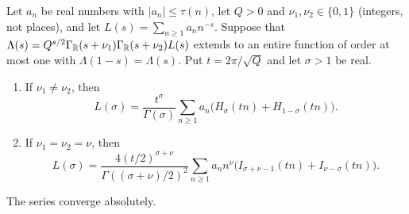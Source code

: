 \begin{lemma}\label{an:balanced-afe}
Let $a_n$ be real numbers with $|a_n|\le\tau(n)$, let $Q>0$ and
$\nu_1,\nu_2\in\{0,1\}$ (integers, not places), and let
$L(s)=\sum_{n\ge1}a_nn^{-s}$. Suppose that
$\Lambda(s)=Q^{s/2}\Gamma_\mathbb R(s+\nu_1)\Gamma_\mathbb R(s+\nu_2)L(s)$ extends to an
entire function of order at most one with $\Lambda(1-s)=\Lambda(s)$. Put
$t=2\pi/\sqrt Q$ and let $\sigma>1$ be real.
\begin{enumerate}
\item If $\nu_1\ne\nu_2$, then
\[
 L(\sigma)=\frac{t^\sigma}{\Gamma(\sigma)}\sum_{n\ge1}a_n
 \bigl(H_\sigma(tn)+H_{1-\sigma}(tn)\bigr).
\]
\item If $\nu_1=\nu_2=\nu$, then
\[
 L(\sigma)=\frac{4(t/2)^{\sigma+\nu}}{\Gamma((\sigma+\nu)/2)^2}
 \sum_{n\ge1}a_nn^\nu
 \bigl(I_{\sigma+\nu-1}(tn)+I_{\nu-\sigma}(tn)\bigr).
\]
\end{enumerate}
The series converge absolutely.
\end{lemma}

